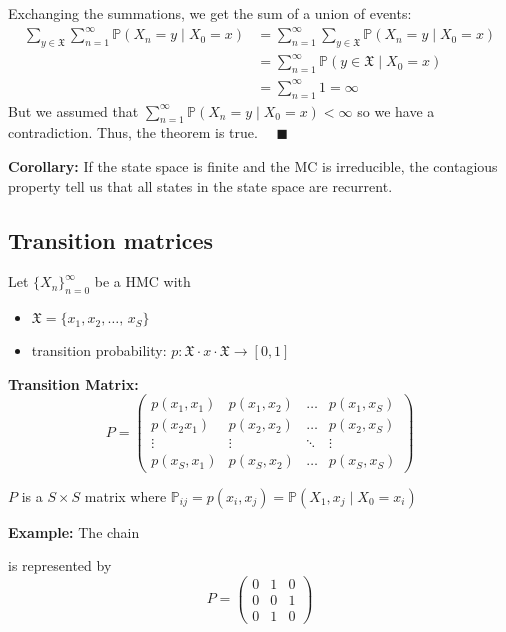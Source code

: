 \documentclass[12pt]{article}
\renewcommand{\P}{\mathbb{P}}
\newcommand{\qed}{\quad \blacksquare}
\newcommand{\mfX}{\mathfrak{X}}
\begin{document}
Exchanging the summations, we get the sum of a union of events:
\begin{align*}
    \sum_{y \in \mfX} \sum_{n=1}^\infty \P(X_n = y \; | \; X_0 = x) &= \sum_{n=1}^\infty \sum_{y \in \mfX} \P(X_n = y \; | \; X_0 = x)\\
    &= \sum_{n=1}^\infty \P(y \in \mfX \; | \; X_0 = x) \\
    &= \sum_{n=1}^\infty 1 = \infty
\end{align*}
But we assumed that $\sum_{n=1}^\infty \P(X_n = y \; | \; X_0 = x) < \infty$ so we have a contradiction. Thus, the theorem is true. $\qed$

\textbf{Corollary:} If the state space is finite and the MC is irreducible, the contagious property tell us that all states in the state space are recurrent. 

\subsection{Transition matrices}
Let $\{X_n\}_{n=0}^\infty$ be a HMC with 
\begin{itemize}
    \item $\mfX = \{x_1, x_2, \dots, \, x_S\}$
    \item transition probability: $p: \mfX\cdot x \cdot \mfX \to [0, 1]$
\end{itemize}

\textbf{Transition Matrix:} 
\[P = \begin{pmatrix}
    p(x_1, x_1) & p(x_1, x_2) & \dots & p(x_1, x_S)\\
    p(x_2 x_1) & p(x_2, x_2) & \dots & p(x_2, x_S)\\
    \vdots & \vdots & \ddots  & \vdots\\
    p(x_S, x_1) & p(x_S, x_2) & \dots & p(x_S, x_S)
\end{pmatrix}\]

$P$ is a $S \times S$ matrix where $\P_{ij} = p(x_i, x_j) = \P(X_1, x_j \; | \; X_0 = x_i)$

\textbf{Example:} The chain 
\begin{center}
\end{center}
is represented by
\[P = \begin{pmatrix}
    0 & 1 & 0\\
    0 & 0 & 1\\
    0 & 1 & 0
\end{pmatrix}\] 
\end{document}
